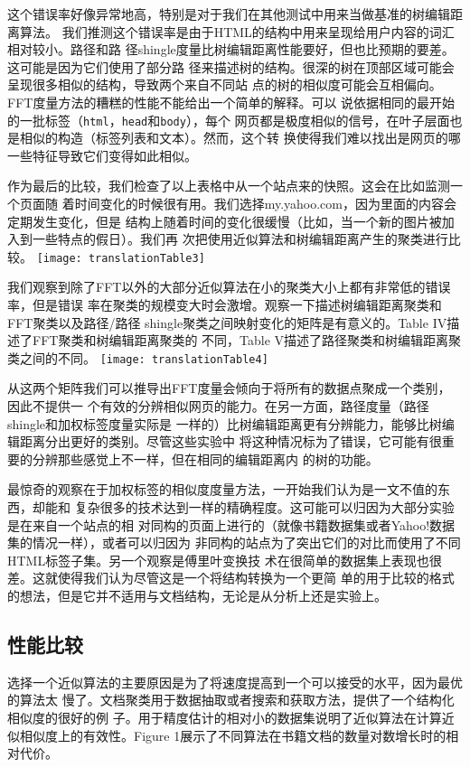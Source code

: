 这个错误率好像异常地高，特别是对于我们在其他测试中用来当做基准的树编辑距离算法。
我们推测这个错误率是由于HTML的结构中用来呈现给用户内容的词汇相对较小。路径和路
径shingle度量比树编辑距离性能要好，但也比预期的要差。这可能是因为它们使用了部分路
径来描述树的结构。很深的树在顶部区域可能会呈现很多相似的结构，导致两个来自不同站
点的树的相似度可能会互相偏向。FFT度量方法的糟糕的性能不能给出一个简单的解释。可以
说依据相同的最开始的一批标签（\texttt{html}，\texttt{head}和\texttt{body}），每个
网页都是极度相似的信号，在叶子层面也是相似的构造（标签列表和文本）。然而，这个转
换使得我们难以找出是网页的哪一些特征导致它们变得如此相似。

作为最后的比较，我们检查了以上表格中从一个站点来的快照。这会在比如监测一个页面随
着时间变化的时候很有用。我们选择my.yahoo.com，因为里面的内容会定期发生变化，但是
结构上随着时间的变化很缓慢（比如，当一个新的图片被加入到一些特点的假日）。我们再
次把使用近似算法和树编辑距离产生的聚类进行比较。{\centering
  \texttt{[image: translationTable3]}
}

我们观察到除了FFT以外的大部分近似算法在小的聚类大小上都有非常低的错误率，但是错误
率在聚类的规模变大时会激增。观察一下描述树编辑距离聚类和FFT聚类以及路径/路径
shingle聚类之间映射变化的矩阵是有意义的。Table IV描述了FFT聚类和树编辑距离聚类的
不同，Table V描述了路径聚类和树编辑距离聚类之间的不同。
{\centering
  \texttt{[image: translationTable4]}
}

从这两个矩阵我们可以推导出FFT度量会倾向于将所有的数据点聚成一个类别，因此不提供一
个有效的分辨相似网页的能力。在另一方面，路径度量（路径shingle和加权标签度量实际是
一样的）比树编辑距离更有分辨能力，能够比树编辑距离分出更好的类别。尽管这些实验中
将这种情况标为了错误，它可能有很重要的分辨那些感觉上不一样，但在相同的编辑距离内
的树的功能。

最惊奇的观察在于加权标签的相似度度量方法，一开始我们认为是一文不值的东西，却能和
复杂很多的技术达到一样的精确程度。这可能可以归因为大部分实验是在来自一个站点的相
对同构的页面上进行的（就像书籍数据集或者Yahoo!数据集的情况一样），或者可以归因为
非同构的站点为了突出它们的对比而使用了不同HTML标签子集。另一个观察是傅里叶变换技
术在很简单的数据集上表现也很差。这就使得我们认为尽管这是一个将结构转换为一个更简
单的用于比较的格式的想法，但是它并不适用与文档结构，无论是从分析上还是实验上。

\subsection{性能比较}
选择一个近似算法的主要原因是为了将速度提高到一个可以接受的水平，因为最优的算法太
慢了。文档聚类用于数据抽取或者搜索和获取方法，提供了一个结构化相似度的很好的例
子。用于精度估计的相对小的数据集说明了近似算法在计算近似相似度上的有效性。Figure
1展示了不同算法在书籍文档的数量对数增长时的相对代价。

